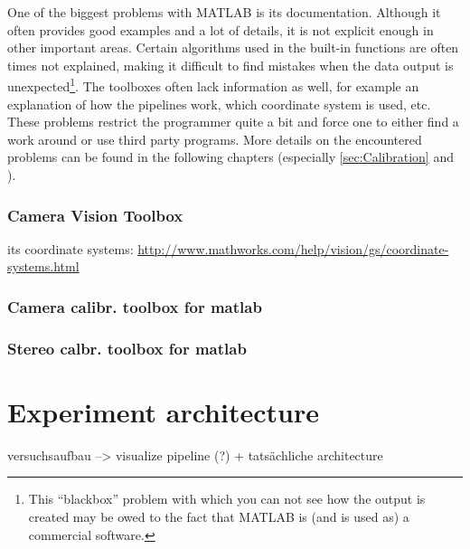 One of the biggest problems with MATLAB is its documentation. Although it often provides good examples and a lot of details, it is not explicit enough in other important areas. Certain algorithms used in the built-in functions are often times not explained, making it difficult to find mistakes when the data output is unexpected\footnote{This \enquote{blackbox} problem with which you can not see how the output is created may be owed to the fact that MATLAB is (and is used as) a commercial software.}. The toolboxes often lack information as well, for example an explanation of how the pipelines work, which coordinate system is used, etc. These problems restrict the programmer quite a bit and force one to either find a work around or use third party programs. More details on the encountered problems can be found in the following chapters (especially \autoref{sec:Calibration} and ).

\subsubsection{Camera Vision Toolbox}
its coordinate systems: \url{http://www.mathworks.com/help/vision/gs/coordinate-systems.html}
\subsubsection{Camera calibr. toolbox for matlab}
\subsubsection{Stereo calbr. toolbox for matlab}




\section{Experiment architecture} \label{sec:architecture}
versuchsaufbau --> visualize pipeline (?) + tatsächliche architecture